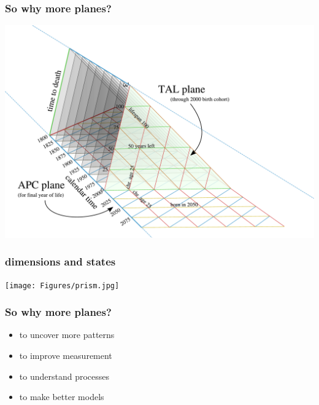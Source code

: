 \documentclass[20pt]{beamer}
\begin{document}

\begin{frame}
\frametitle{So why more planes?}
\vspace{-4em}
\begin{center}
\includegraphics[scale=.8]{Figures/TALisomarkedup2PAA.pdf}
\end{center}
\end{frame}




\begin{frame}
\frametitle{dimensions and states}
\vspace{-10em}
\begin{center}
\hspace*{-6cm}\texttt{[image: Figures/prism.jpg]}
\end{center}
\end{frame}


\begin{frame}
\frametitle{So why more planes?}
\normalsize
\begin{itemize}[<+->]
  \item to uncover more patterns
  \item to improve measurement
  \item to understand processes
  \item to make better models
\end{itemize}
\end{frame}
\end{document}
